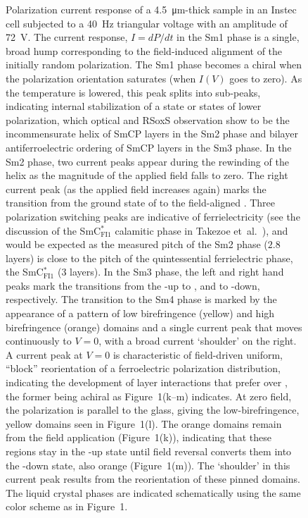 \documentclass[superscriptaddress,floatfix,onecolumn,notitlepage]{revtex4-1}
\begin{document}
\begin{figure}[H]
    \caption{Polarization current response of a \SI{4.5}{\micro\metre}-thick  sample in an Instec cell subjected  to a \SI{40}{\hertz} triangular voltage with an amplitude of \SI{72}{\volt}.
The current response, $I = dP/dt$ in the Sm1 phase is a single, broad hump
corresponding to the field-induced alignment of the initially random polarization.
The Sm1 phase becomes a chiral  when the polarization orientation saturates
(when $I(V)$ goes to zero). As the temperature is lowered, this peak splits into
sub-peaks, indicating internal stabilization of a state or states of lower
polarization, which optical and RSoxS observation show to be the incommensurate
 helix of  SmCP layers in the Sm2 phase and bilayer
 antiferroelectric ordering of SmCP layers in the Sm3 phase.
In the Sm2  phase, two current peaks appear during the rewinding of the helix as the
magnitude of the applied field falls to zero. The right current peak (as the
applied field increases again) marks the transition from the ground state of  to the field-aligned . Three polarization switching peaks are indicative of ferrielectricity (see the discussion of the SmC$^{*}_\textrm{FI1}$ calamitic phase in Takezoe et~al.~\cite{takezoe2010antiferroelectric}), and would be expected as the measured pitch of the Sm2 phase ($2.8$ layers) is close to the pitch of the quintessential ferrielectric phase, the SmC$^{*}_\textrm{FI1}$ ($3$ layers).
In the Sm3 phase, the left and right hand peaks mark the transitions from the -up to , and  to
-down, respectively.
The transition to the Sm4 phase is marked by the appearance of a pattern of low birefringence (yellow) and high birefringence
(orange) domains and a single current peak that moves continuously to $V=0$,
with a broad current `shoulder' on the right. A current peak at $V = 0$ is characteristic of field-driven
uniform, ``block'' reorientation of a ferroelectric polarization distribution, indicating the
development of layer interactions that prefer  over ,  the former being achiral as Figure~1(k--m) indicates. At zero field, the  polarization is parallel to the glass, giving the low-birefringence, yellow domains seen in Figure~1(l). The orange domains remain from the field application (Figure~1(k)), indicating that these regions stay in the -up state until field reversal converts them into the -down state, also orange (Figure~1(m)). The `shoulder' in this current peak results from the reorientation of these pinned domains. The liquid crystal phases are indicated schematically using the same color scheme as in Figure~1.\label{fig:polz}}
\end{figure}
\end{document}
